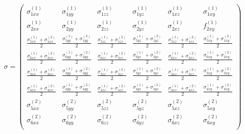 \begin{equation}
\sigma= \begin{pmatrix}
\sigma_{1xx}^{\left(1\right)}&\sigma_{1yy}^{\left(1\right)}&\sigma_{1zz}^{\left(1\right)}&\sigma_{1yz}^{\left(1\right)}&\sigma_{1xz}^{\left(1\right)}&\sigma_{1xy}^{\left(1\right)} \\

\sigma_{2xx}^{\left(1\right)}&\sigma_{2yy}^{\left(1\right)}&\sigma_{2zz}^{\left(1\right)}&\sigma_{2yz}^{\left(1\right)}&\sigma_{2xz}^{\left(1\right)}&f_{2xy}^{\left(1\right)} \\

\frac{\sigma_{5xx}^{\left(1\right)}+\sigma_{1xx}^{\left(2\right)}}{2}&\frac{\sigma_{5yy}^{\left(1\right)}+\sigma_{1yy}^{\left(2\right)}}{2}&\frac{\sigma_{5zz}^{\left(1\right)}+\sigma_{1zz}^{\left(2\right)}}{2}&\frac{\sigma_{5yz}^{\left(1\right)}+\sigma_{1yz}^{\left(2\right)}}{2}&\frac{\sigma_{5xz}^{\left(1\right)}+\sigma_{1xz}^{\left(2\right)}}{2}&\frac{\sigma_{5xy}^{\left(1\right)}+\sigma_{1xy}^{\left(2\right)}}{2}  \\

\frac{\sigma_{6xx}^{\left(1\right)}+\sigma_{2xx}^{\left(2\right)}}{2}&\frac{\sigma_{6yy}^{\left(1\right)}+\sigma_{2yy}^{\left(2\right)}}{2}&\frac{\sigma_{6zz}^{\left(1\right)}+\sigma_{2zz}^{\left(2\right)}}{2}&\frac{\sigma_{6yz}^{\left(1\right)}+\sigma_{2yz}^{\left(2\right)}}{2}&\frac{\sigma_{6xz}^{\left(1\right)}+\sigma_{2xz}^{\left(2\right)}}{2}&\frac{\sigma_{6xy}^{\left(1\right)}+\sigma_{2xy}^{\left(2\right)}}{2} \\

\frac{\sigma_{3xx}^{\left(1\right)}+\sigma_{3xx}^{\left(2\right)}}{2}&\frac{\sigma_{3yy}^{\left(1\right)}+\sigma_{3yy}^{\left(2\right)}}{2}&\frac{\sigma_{3zz}^{\left(1\right)}+\sigma_{3zz}^{\left(2\right)}}{2}&\frac{\sigma_{3yz}^{\left(1\right)}+\sigma_{3yz}^{\left(2\right)}}{2}&\frac{\sigma_{3xz}^{\left(1\right)}+\sigma_{3xz}^{\left(2\right)}}{2}&\frac{\sigma_{3xy}^{\left(1\right)}+\sigma_{3xy}^{\left(2\right)}}{2} \\

\frac{\sigma_{4xx}^{\left(1\right)}+\sigma_{4xx}^{\left(2\right)}}{2}&\frac{\sigma_{4yy}^{\left(1\right)}+\sigma_{4yy}^{\left(2\right)}}{2}&\frac{\sigma_{4zz}^{\left(1\right)}+\sigma_{4zz}^{\left(2\right)}}{2}&\frac{\sigma_{4yz}^{\left(1\right)}+\sigma_{4yz}^{\left(2\right)}}{2}&\frac{\sigma_{4xz}^{\left(1\right)}+\sigma_{4xz}^{\left(2\right)}}{2}&\frac{\sigma_{4xy}^{\left(1\right)}+\sigma_{4xy}^{\left(2\right)}}{2} \\

\sigma_{5xx}^{\left(2\right)}&\sigma_{5yy}^{\left(2\right)}&\sigma_{5zz}^{\left(2\right)}&\sigma_{5yz}^{\left(2\right)}&\sigma_{5xz}^{\left(2\right)}&\sigma_{5xy}^{\left(2\right)} \\
\sigma_{6xx}^{\left(2\right)}&\sigma_{6yy}^{\left(2\right)}&\sigma_{6zz}^{\left(2\right)}&\sigma_{6yz}^{\left(2\right)}&\sigma_{6xz}^{\left(2\right)}&\sigma_{6xy}^{\left(2\right)} \\
\end{pmatrix} 
\end{equation}

